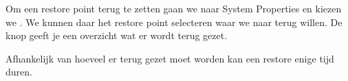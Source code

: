 Om een restore point terug te zetten gaan we naar System Properties en kiezen we . We kunnen daar het restore point selecteren waar we naar terug willen. De knop  geeft je een overzicht wat er wordt terug gezet.

\begin{minipage}[t]{\linewidth}
\raggedright
{}
\end{minipage}

Afhankelijk van hoeveel er terug gezet moet worden kan een restore enige tijd duren.

